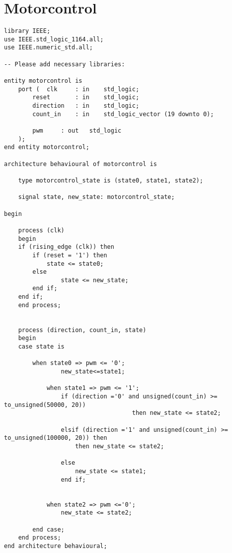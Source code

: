 \section{Motorcontrol}
 \begin{lstlisting}[style=vhdlStyle]
 library IEEE;
use IEEE.std_logic_1164.all;
use IEEE.numeric_std.all;

-- Please add necessary libraries:

entity motorcontrol is
	port (	clk		: in	std_logic;
		reset		: in	std_logic;
		direction	: in	std_logic;
		count_in	: in	std_logic_vector (19 downto 0); 

		pwm		: out	std_logic
	);
end entity motorcontrol;

architecture behavioural of motorcontrol is
	
	type motorcontrol_state is (state0, state1, state2);

	signal state, new_state: motorcontrol_state;

begin 

    process (clk)
    begin
	if (rising_edge (clk)) then
		if (reset = '1') then
    		state <= state0;
		else
				state <= new_state;
		end if;
	end if;
    end process;


    process (direction, count_in, state)
    begin
	case state is

    	when state0 => pwm <= '0';
				new_state<=state1;
			
			when state1 => pwm <= '1';
				if (direction ='0' and unsigned(count_in) >= to_unsigned(50000, 20)) 
                                    then new_state <= state2;
					
				elsif (direction ='1' and unsigned(count_in) >= to_unsigned(100000, 20)) then
				    then new_state <= state2;

				else
					new_state <= state1;
				end if;


			when state2 => pwm <='0';
				new_state <= state2;

		end case;
	end process;
end architecture behavioural;
 \end{lstlisting}

\newpage
